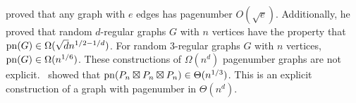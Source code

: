 \textcite{malitzGraphsEdgesHave1994} proved that any graph with $e$ edges has pagenumber $O(\sqrt{e})$. Additionally, he proved that random $d$-regular graphs $G$ with $n$ vertices have the property that $\operatorname{pn}(G) \in \Omega(\sqrt{d} n^{1/2 - 1/d})$. For random 3-regular graphs $G$ with $n$ vertices, $\operatorname{pn}(G) \in \Omega(n^{1/6})$. These constructions of $\Omega(n^d)$ pagenumber graphs are not explicit.\ \textcite{eppsteinThreeDimensionalGraphProducts2024} showed that $\operatorname{pn}(P_n \boxtimes P_n \boxtimes P_n) \in \Theta(n^{1/3})$. This is an explicit construction of a graph with pagenumber in $\Theta(n^{d})$. 